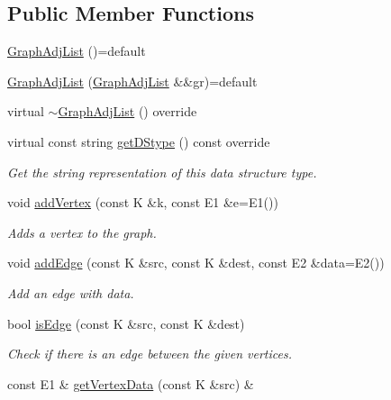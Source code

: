 \subsection*{Public Member Functions}
\begin{DoxyCompactItemize}
\item 
\hyperlink{classbridges_1_1datastructure_1_1_graph_adj_list_adb181bcfe104b8df8b3218ccf1b67ea5}{Graph\+Adj\+List} ()=default
\item 
\hyperlink{classbridges_1_1datastructure_1_1_graph_adj_list_ac175167a4447f3fc9c7f3e72f2f6a0b1}{Graph\+Adj\+List} (\hyperlink{classbridges_1_1datastructure_1_1_graph_adj_list}{Graph\+Adj\+List} \&\&gr)=default
\item 
virtual \hyperlink{classbridges_1_1datastructure_1_1_graph_adj_list_a17413dc27d7e60e1aa31cafa32082d12}{$\sim$\+Graph\+Adj\+List} () override
\item 
virtual const string \hyperlink{classbridges_1_1datastructure_1_1_graph_adj_list_adf1bfde5ec7192f3ee334695059f8fa6}{get\+D\+Stype} () const override
\begin{DoxyCompactList}\small\item\em Get the string representation of this data structure type. \end{DoxyCompactList}\item 
void \hyperlink{classbridges_1_1datastructure_1_1_graph_adj_list_a3bde76e49be4330da895103475f8430b}{add\+Vertex} (const K \&k, const E1 \&e=E1())
\begin{DoxyCompactList}\small\item\em Adds a vertex to the graph. \end{DoxyCompactList}\item 
void \hyperlink{classbridges_1_1datastructure_1_1_graph_adj_list_a6573cc104657315196404bcef481d890}{add\+Edge} (const K \&src, const K \&dest, const E2 \&data=E2())
\begin{DoxyCompactList}\small\item\em Add an edge with data. \end{DoxyCompactList}\item 
bool \hyperlink{classbridges_1_1datastructure_1_1_graph_adj_list_a926702012e62a91affc14b62802724e4}{is\+Edge} (const K \&src, const K \&dest)
\begin{DoxyCompactList}\small\item\em Check if there is an edge between the given vertices. \end{DoxyCompactList}\item 
const E1 \& \hyperlink{classbridges_1_1datastructure_1_1_graph_adj_list_a3a9d3875e7f6eb0d4c3500c53957b9c1}{get\+Vertex\+Data} (const K \&src) \&

\end{DoxyCompactItemize}

